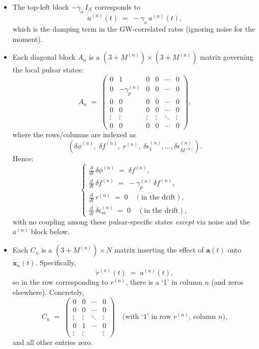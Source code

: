 \documentclass[]{scrartcl}
\begin{document}
\begin{itemize}
\item
The top-left block $-\gamma_a\,I_N$ corresponds to
\[
\dot{a}^{(n)}(t)
\;=\;
-\gamma_a \,a^{(n)}(t),
\]
which is the damping term in the GW-correlated rates (ignoring noise for the moment).

\item
Each diagonal block $A_n$ is a $(3 + M^{(n)})\times(3 + M^{(n)})$ matrix governing the local pulsar states:
\[
A_n
\;=\;
\begin{pmatrix}
0 & 1 & 0 & 0 & \cdots & 0\\
0 & -\gamma_{p}^{(n)} & 0 & 0 & \cdots & 0\\
0 & 0 & 0 & 0 & \cdots & 0\\
0 & 0 & 0 & 0 & \cdots & 0\\
\vdots & \vdots & \vdots & \vdots & \ddots & \vdots\\
0 & 0 & 0 & 0 & \cdots & 0
\end{pmatrix},
\]
where the rows/columns are indexed as
\[
(\delta\phi^{(n)},\;\delta f^{(n)},\;r^{(n)},\;\delta\epsilon_1^{(n)},\ldots,\delta\epsilon_{M^{(n)}}^{(n)}).
\]
Hence:
\[
\begin{cases}
\displaystyle \frac{d}{dt}\,\delta\phi^{(n)} \;=\; \delta f^{(n)},\\[3pt]
\displaystyle \frac{d}{dt}\,\delta f^{(n)}
\;=\;
-\gamma_{p}^{(n)}\,\delta f^{(n)},
\\[3pt]
\displaystyle \frac{d}{dt}\,r^{(n)}
\;=\;
0 \quad (\text{in the drift}),
\\
\displaystyle \frac{d}{dt}\,\delta\epsilon_{m}^{(n)}
\;=\;
0 \quad (\text{in the drift}),
\end{cases}
\]
with no coupling among these pulsar-specific states \emph{except} via noise and the $a^{(n)}$ block below.

\item
Each $C_n$ is a $(3 + M^{(n)})\times N$ matrix inserting the effect of $\mathbf{a}(t)$ onto $\dot{\mathbf{x}}_n(t)$.  Specifically,
\[
\dot{r}^{(n)}(t)\;=\;a^{(n)}(t),
\]
so in the row corresponding to $r^{(n)}$, there is a `1' in column $n$ (and zeros elsewhere).  Concretely,
\[
C_n
\;=\;
\begin{pmatrix}
0 & 0 & \cdots & 0\\
0 & 0 & \cdots & 0\\
\vdots & \vdots & \ddots & \vdots\\
0 & 1 & \cdots & 0\\
\vdots & \vdots & & \vdots
\end{pmatrix}
\quad
\text{(with `1' in row $r^{(n)}$, column $n$)},
\]
and all other entries zero.
\end{itemize}
\end{document}

